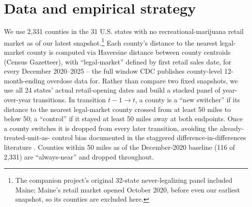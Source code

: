 \documentclass[preprint,12pt,authoryear]{elsarticle}
\begin{document}
\section{Data and empirical strategy}

We use 2,331 counties in the 31 U.S. states with no
recreational-marijuana retail market as of our latest
snapshot.\footnote{The companion project's original 32-state
never-legalizing panel included Maine; Maine's retail market opened
October 2020, before even our earliest snapshot, so its counties are
excluded here.} Each county's distance to the nearest legal-market
county is computed via Haversine distance between county centroids
(Census Gazetteer), with ``legal-market'' defined by first retail
sales date, for every December 2020--2025 -- the full window CDC
publishes county-level 12-month-ending overdose data for. Rather than
compare two fixed snapshots, we use all 24 states' actual
retail-opening dates and build a stacked panel of year-over-year
transitions. In transition $t-1\to t$, a county is a ``new switcher''
if its distance to the nearest legal-market county crossed from at
least 50 miles to below 50; a ``control'' if it stayed at least 50
miles away at both endpoints. Once a county switches it is dropped
from every later transition, avoiding the already-treated-unit-as-
control bias documented in the staggered difference-in-differences
literature \citep{GoodmanBacon2021}. Counties within 50 miles as of
the December-2020 baseline (116 of 2,331) are ``always-near'' and
dropped throughout.
\end{document}
